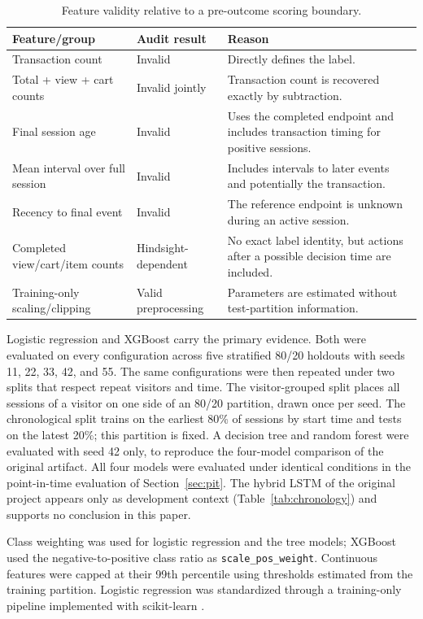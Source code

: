 \documentclass[conference, letterpaper]{IEEEtran}
\begin{document}
\begin{table}[t]
\caption{Feature validity relative to a pre-outcome scoring boundary.}
\label{tab:audit}
\centering
\scriptsize
\begin{tabularx}{\columnwidth}{@{}L{0.27\columnwidth}L{0.22\columnwidth}Y@{}}
\toprule
Feature/group & Audit result & Reason \\
\midrule
Transaction count & Invalid & Directly defines the label. \\
Total + view + cart counts & Invalid jointly & Transaction count is recovered exactly by subtraction. \\
Final session age & Invalid & Uses the completed endpoint and includes transaction timing for positive sessions. \\
Mean interval over full session & Invalid & Includes intervals to later events and potentially the transaction. \\
Recency to final event & Invalid & The reference endpoint is unknown during an active session. \\
Completed view/cart/item counts & Hindsight-dependent & No exact label identity, but actions after a possible decision time are included. \\
Training-only scaling/clipping & Valid preprocessing & Parameters are estimated without test-partition information. \\
\bottomrule
\end{tabularx}
\end{table}

Logistic regression and XGBoost \cite{chen2016} carry the primary evidence. Both were evaluated on every configuration across five stratified 80/20 holdouts with seeds 11, 22, 33, 42, and 55. The same configurations were then repeated under two splits that respect repeat visitors and time. The visitor-grouped split places all sessions of a visitor on one side of an 80/20 partition, drawn once per seed. The chronological split trains on the earliest 80\% of sessions by start time and tests on the latest 20\%; this partition is fixed. A decision tree and random forest \cite{breiman2001} were evaluated with seed 42 only, to reproduce the four-model comparison of the original artifact. All four models were evaluated under identical conditions in the point-in-time evaluation of Section~\ref{sec:pit}. The hybrid LSTM of the original project appears only as development context (Table~\ref{tab:chronology}) and supports no conclusion in this paper.

Class weighting was used for logistic regression and the tree models; XGBoost used the negative-to-positive class ratio as \texttt{scale\_pos\_weight}. Continuous features were capped at their 99th percentile using thresholds estimated from the training partition. Logistic regression was standardized through a training-only pipeline implemented with scikit-learn \cite{pedregosa2011}.
\end{document}
